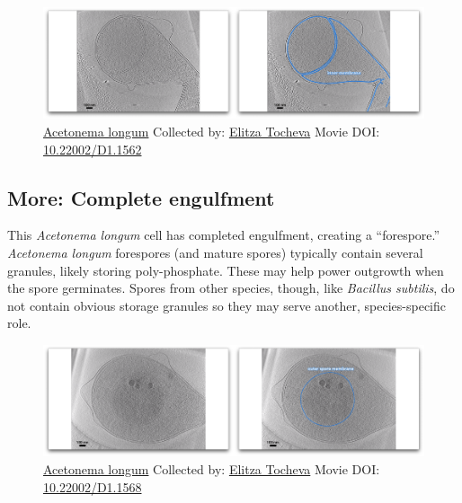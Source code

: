 \documentclass[]{tufte-book}
\begin{document}
\begin{figure}
\includegraphics{movie_stills/8_10} \caption[\protect\hyperlink{tree}{Acetonema longum} Collected by:
\protect\hyperlink{elitza_tocheva}{Elitza Tocheva} Movie DOI:
\href{https://doi.org/10.22002/D1.1562}{10.22002/D1.1562}]{\protect\hyperlink{tree}{Acetonema longum} Collected by:
\protect\hyperlink{elitza_tocheva}{Elitza Tocheva} Movie DOI:
\href{https://doi.org/10.22002/D1.1562}{10.22002/D1.1562}}\label{fig:8-10}
\end{figure}

\hypertarget{Complete_engulfment}{\subsection*{More: Complete
engulfment}\label{Complete_engulfment}}

This \emph{Acetonema longum} cell has completed engulfment, creating a
``forespore.'' \emph{Acetonema longum} forespores (and mature spores)
typically contain several granules, likely storing poly-phosphate. These
may help power outgrowth when the spore germinates. Spores from other
species, though, like \emph{Bacillus subtilis}, do not contain obvious
storage granules so they may serve another, species-specific role.





\begin{figure}
\includegraphics{movie_stills/8_10a} \caption[\protect\hyperlink{tree}{Acetonema longum} Collected by:
\protect\hyperlink{elitza_tocheva}{Elitza Tocheva} Movie DOI:
\href{https://doi.org/10.22002/D1.1568}{10.22002/D1.1568}]{\protect\hyperlink{tree}{Acetonema longum} Collected by:
\protect\hyperlink{elitza_tocheva}{Elitza Tocheva} Movie DOI:
\href{https://doi.org/10.22002/D1.1568}{10.22002/D1.1568}}\label{fig:8-10a}
\end{figure}
\end{document}
